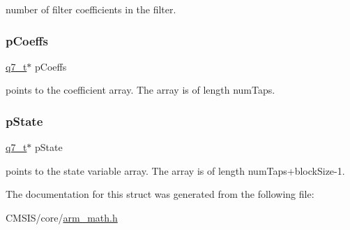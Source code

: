 number of filter coefficients in the filter. \mbox{\label{structarm__fir__instance__q7_a54407554b4fe7bbbb43924e4eea45e7f}} 
\subsubsection{\texorpdfstring{pCoeffs}{pCoeffs}}
{\footnotesize\ttfamily \mbox{\hyperlink{arm__math_8h_ae541b6f232c305361e9b416fc9eed263}{q7\+\_\+t}}$\ast$ p\+Coeffs}

points to the coefficient array. The array is of length num\+Taps. \mbox{\label{structarm__fir__instance__q7_aa8f67102521b620af6f259afdcf29785}} 
\subsubsection{\texorpdfstring{pState}{pState}}
{\footnotesize\ttfamily \mbox{\hyperlink{arm__math_8h_ae541b6f232c305361e9b416fc9eed263}{q7\+\_\+t}}$\ast$ p\+State}

points to the state variable array. The array is of length num\+Taps+block\+Size-\/1. 

The documentation for this struct was generated from the following file\+:\begin{DoxyCompactItemize}
\item 
C\+M\+S\+I\+S/core/\mbox{\hyperlink{arm__math_8h}{arm\+\_\+math.\+h}}\end{DoxyCompactItemize}
